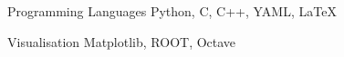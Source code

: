 
\begin{cvskills}
    \cvskill
        {Programming Languages} %
        {Python, C, C++, YAML, LaTeX} %

    \cvskill
        {Visualisation}
        {Matplotlib, ROOT, Octave}

\end{cvskills}

